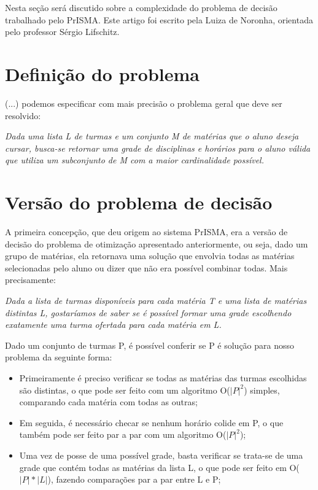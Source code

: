 \documentclass[graduacao,brazil]{ThesisPUC}
\begin{document}
Nesta seção será discutido sobre a complexidade do problema de decisão trabalhado pelo PrISMA. Este artigo foi escrito pela Luiza de Noronha, orientada pelo professor Sérgio Lifschitz.

\section{Definição do problema}

(...) podemos especificar com mais precisão o problema geral que deve ser resolvido:

\vspace{3 mm}
\textit{Dada uma lista L de turmas e um conjunto M de matérias que o aluno deseja cursar, busca-se retornar uma grade de disciplinas e horários para o aluno válida que utiliza um subconjunto de M com a maior cardinalidade possível.}
\vspace{3 mm}

\section{Versão do problema de decisão}

A primeira concepção, que deu origem ao sistema PrISMA, era a versão de decisão do problema de otimização apresentado anteriormente, ou seja, dado um grupo de matérias, ela retornava uma solução que envolvia todas as matérias selecionadas pelo aluno ou dizer que não era possível combinar todas. Mais precisamente:

\vspace{3 mm}
\textit{Dada a lista de turmas disponíveis para cada matéria T e uma lista de matérias distintas L, gostaríamos de saber se é possível formar uma grade escolhendo exatamente uma turma ofertada para cada matéria em L.}
\vspace{3 mm}

Dado um conjunto de turmas P, é possível conferir se P é solução para nosso problema da seguinte forma:

\begin{itemize}
	\item Primeiramente é preciso verificar se todas as matérias das turmas escolhidas são distintas, o que pode ser feito com um algoritmo O($|P|^2$) simples, comparando cada matéria com todas as outras;
	\item Em seguida, é necessário checar se nenhum horário colide em P, o que também pode ser feito par a par com um algoritmo O($|P|^2$);
	\item Uma vez de posse de uma possível grade, basta verificar se trata-se de uma grade que contém todas as matérias da lista L, o que pode ser feito em O($|P|*|L|$), fazendo comparações par a par entre L e P;
\end{itemize}
\end{document}
